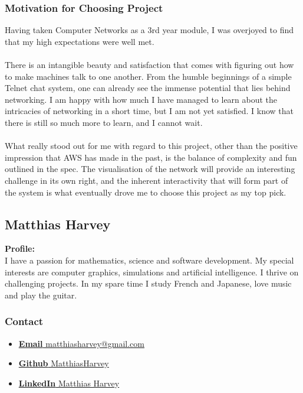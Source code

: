 \documentclass{article}
\begin{document}
	\subsubsection{Motivation for Choosing Project}
	Having taken Computer Networks as a 3rd year module, I was overjoyed to find that my high 	expectations were well met. 
\\\\
There is an intangible beauty and satisfaction that comes with figuring out how to make machines talk to one another. From the humble beginnings of a simple Telnet chat system, one can already see the immense potential that lies behind networking. I am happy with how much I have managed to learn about the intricacies of networking in a short time, but I am not yet satisfied. I know that there is still so much more to learn, and I cannot wait.
\\\\
	What really stood out for me with regard to this project, other than the positive impression that AWS has made in the past, is the balance of complexity and fun outlined in the spec. The visualisation of the network will provide an interesting challenge in its own right, and the inherent interactivity that will form part of the system is what eventually drove me to choose this project as my top pick.  

	\cleardoublepage

	\subsection{Matthias Harvey}
	\textbf{Profile:}\\
	I have a passion for mathematics, science and software development. My special interests are computer graphics, simulations and artificial intelligence. I thrive on challenging projects. In my spare time I study French and Japanese, love music and play the guitar.
	\subsubsection{Contact}
	\begin{itemize}
		\item \href{mailto:matthiasharvey@gmail.com}{\textbf{Email} matthiasharvey@gmail.com}
		\item \href{https://github.com/MatthiasHarvey}{\textbf{Github} MatthiasHarvey}	
		\item \href{https://za.linkedin.com/in/matthias-harvey-68b30995}{\textbf{LinkedIn} Matthias Harvey}
	\end{itemize}
\end{document}
